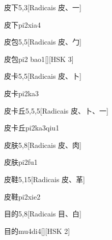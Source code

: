 \begin{entry}{皮下}{5,3}[Radicais ⽪、⼀]
  \begin{phonetics}{皮下}{pi2xia4}
  \end{phonetics}
\end{entry}

\begin{entry}{皮包}{5,5}[Radicais ⽪、⼓]
  \begin{phonetics}{皮包}{pi2 bao1}[][HSK 3]
  \end{phonetics}
\end{entry}

\begin{entry}{皮卡}{5,5}[Radicais ⽪、⼘]
  \begin{phonetics}{皮卡}{pi2ka3}
  \end{phonetics}
\end{entry}

\begin{entry}{皮卡丘}{5,5,5}[Radicais ⽪、⼘、⼀]
  \begin{phonetics}{皮卡丘}{pi2ka3qiu1}
  \end{phonetics}
\end{entry}

\begin{entry}{皮肤}{5,8}[Radicais ⽪、⾁]
  \begin{phonetics}{皮肤}{pi2fu1}
  \end{phonetics}
\end{entry}

\begin{entry}{皮鞋}{5,15}[Radicais ⽪、⾰]
  \begin{phonetics}{皮鞋}{pi2xie2}
  \end{phonetics}
\end{entry}

\begin{entry}{目的}{5,8}[Radicais ⽬、⽩]
  \begin{phonetics}{目的}{mu4di4}[][HSK 2]
  \end{phonetics}
\end{entry}

